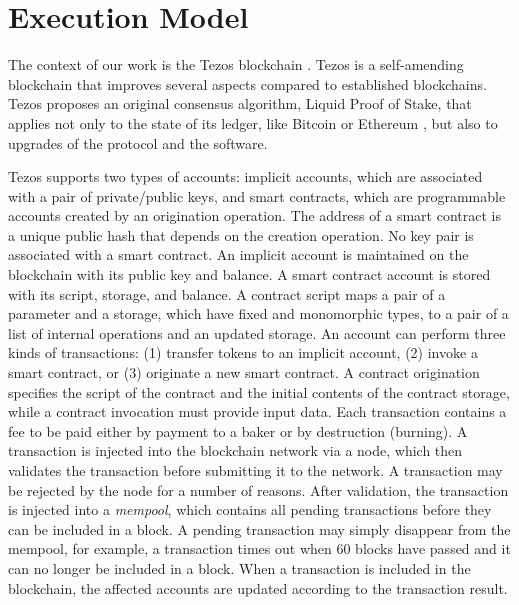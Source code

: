 \documentclass[runningheads]{llncs}
\begin{document}
\section{Execution Model}
\label{sec:execution-model}
The context of our work is the Tezos blockchain
\cite{tezos-whitepaper,tezos-intropaper}. Tezos is a self-amending
blockchain that improves several aspects compared to established
blockchains. Tezos proposes an original consensus algorithm,
Liquid Proof of Stake, that applies not only to the state of
its ledger, like Bitcoin \cite{bitcoin-whitepaper} or Ethereum
\cite{eth-whitepaper}, but also to upgrades of the protocol and the software.

Tezos supports two types of accounts: implicit accounts, which
are associated with a pair of private/public keys, and smart
contracts, which are programmable accounts created by an origination
operation. The address of a smart
contract is a unique public hash that depends on the creation
operation. No key pair is associated with a smart contract. An
implicit account is maintained on the blockchain with 
its public key and balance.
A smart contract account is stored with its script, storage,
and balance. A contract script maps a pair of a parameter and a
storage, which have fixed and monomorphic types, to a pair of a list of
internal operations and an updated storage. An account can
perform three kinds of transactions: (1) transfer tokens to an
implicit account, (2) invoke a smart contract, or (3) originate a new
smart contract. A contract origination specifies the script of the
contract and the initial contents of the contract storage, while a
contract invocation must provide input data. Each transaction contains
a fee to be paid either by payment to a baker or by destruction
(burning). A transaction is injected into the blockchain network via a
node, which then validates the transaction before submitting it to the
network. A transaction may be rejected by the node for a
number of reasons. After validation, the transaction is injected into
a \emph{mempool}, which contains all pending transactions before they can
be included in a block. A pending transaction may simply disappear
from the mempool, for example, a transaction times out when 60 blocks
have passed and it can no longer be included in a block. When a transaction
is included in the blockchain, the affected accounts are updated
according to the transaction result.  
\end{document}
